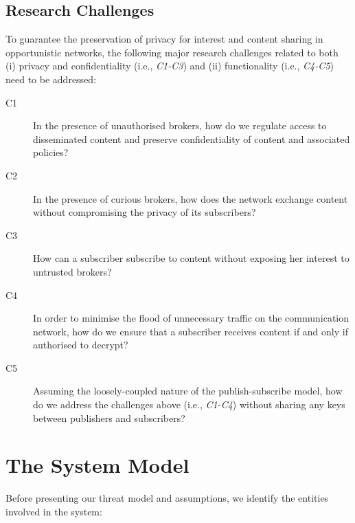 \documentclass[epsfig,a4paper,11pt,titlepage]{book}
\numberwithin{algorithm}{chapter}
\begin{document}
\subsection{Research Challenges}
\label{sec:pidgin-challenges}
To guarantee the preservation of privacy for interest and content sharing in opportunistic networks, the following major research challenges related to both (i) privacy and confidentiality (i.e., \textit{C1-C3}) and (ii) functionality (i.e., \textit{C4-C5}) need to be addressed:

\begin{description}

  \item[C1] In the presence of unauthorised brokers, how do we regulate access to disseminated content and preserve confidentiality of content and associated policies?
  
  \item[C2] In the presence of curious brokers, how does the network exchange content without compromising the privacy of its subscribers?
  
  \item[C3] How can a subscriber subscribe to content without exposing her interest to untrusted brokers?
	
	\item[C4] In order to minimise the flood of unnecessary traffic on the communication network, how do we ensure that a subscriber receives content if and only if authorised to decrypt?
	
	\item[C5] Assuming the loosely-coupled nature of the publish-subscribe model, how do we address the challenges above (i.e., \textit{C1-C4}) without sharing any keys between publishers and subscribers?
	
\end{description}


\section{The System Model}
\label{sec:pidgin-system-model}
Before presenting our threat model and assumptions, we identify the entities involved in the system:
\end{document}
